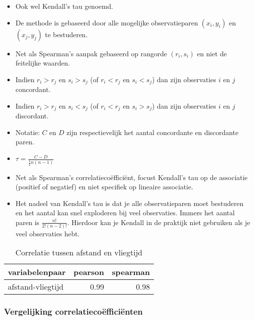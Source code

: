 \documentclass[]{memoir}
\providecommand{\tightlist}{%
  \setlength{\itemsep}{0pt}\setlength{\parskip}{0pt}}
\begin{document}
\begin{itemize}
  \begin{itemize}
  \tightlist
  \item
    Ook wel Kendall's tau genoemd.
  \item
    De methode is gebaseerd door alle mogelijke observatieparen \((x_i, y_i)\) en \((x_j,y_j)\) te bestuderen.
  \item
    Net als Spearman's aanpak gebaseerd op rangorde \((r_i, s_i)\) en niet de feitelijke waarden.
  \item
    Indien \(r_i > r_j\) en \(s_i > s_j\) (of \(r_i < r_j\) en \(s_i < s_j\)) dan zijn observaties \(i\) en \(j\) concordant.
  \item
    Indien \(r_i > r_j\) en \(s_i < s_j\) (of \(r_i < r_j\) en \(s_i > s_j\)) dan zijn observaties \(i\) en \(j\) discordant.
  \item
    Notatie: \(C\) en \(D\) zijn respectievelijk het aantal concordante en discordante paren.
  \item
    \(\tau = \frac{C-D}{\frac{1}{2}n(n-1)}\)
  \item
    Net als Spearman's correlatiecoëfficiënt, focust Kendall's tau op de associatie (positief of negatief) en niet specifiek op lineaire associatie.
  \item
    Het nadeel van Kendall's tau is dat je alle observatieparen moet bestuderen en het aantal kan snel exploderen bij veel observaties. Immers het aantal paren is \(\frac{n!}{2!(n-2)!}\). Hierdoor kan je Kendall in de praktijk niet gebruiken als je veel observaties hebt.
  \end{itemize}
\end{itemize}

\begin{table}[t]

\caption{\label{tab:4-12}Correlatie tussen afstand en vliegtijd}
\centering
\fontsize{10}{12}\selectfont
\begin{tabular}{lrr}
\toprule
variabelenpaar & pearson & spearman\\
\midrule
afstand-vliegtijd & 0.99 & 0.98\\
\bottomrule
\end{tabular}
\end{table}

\hypertarget{vergelijking-correlatiecoefficienten}{%
\subsubsection*{Vergelijking correlatiecoëfficiënten}\label{vergelijking-correlatiecoefficienten}}
\end{document}
